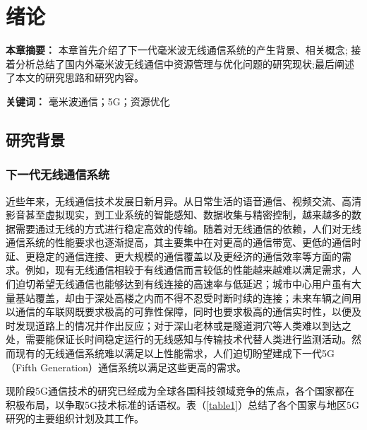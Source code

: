 \chapter{绪论}

\textbf{本章摘要：} 本章首先介绍了下一代毫米波无线通信系统的产生背景、相关概念; 接着分析总结了国内外毫米波无线通信中资源管理与优化问题的研究现状;最后阐述了本文的研究思路和研究内容。

\textbf{关键词：} 毫米波通信；5G；资源优化


\section{研究背景}

\subsection{下一代无线通信系统}

近些年来，无线通信技术发展日新月异。从日常生活的语音通信、视频交流、高清影音甚至虚拟现实，到工业系统的智能感知、数据收集与精密控制，越来越多的数据需要通过无线的方式进行稳定高效的传输。随着对无线通信的依赖，人们对无线通信系统的性能要求也逐渐提高，其主要集中在对更高的通信带宽、更低的通信时延、更稳定的通信连接、更大规模的通信覆盖以及更经济的通信效率等方面的需求。例如，现有无线通信相较于有线通信而言较低的性能越来越难以满足需求，人们迫切希望无线通信也能够达到有线连接的高速率与低延迟；城市中心用户虽有大量基站覆盖，却由于深处高楼之内而不得不忍受时断时续的连接；未来车辆之间用以通信的车联网既要求极高的可靠性保障，同时也要求极高的通信实时性，以便及时发现道路上的情况并作出反应；对于深山老林或是隧道洞穴等人类难以到达之处，需要能保证长时间稳定运行的无线感知与传输技术代替人类进行监测活动。然而现有的无线通信系统难以满足以上性能需求，人们迫切盼望建成下一代5G（Fifth Generation）通信系统\cite{shafi20175g}以满足这些更高的需求。

现阶段5G通信技术的研究已经成为全球各国科技领域竞争的焦点，各个国家都在积极布局，以争取5G技术标准的话语权。表（\ref{table1}）总结了各个国家与地区5G研究的主要组织计划及其工作。

